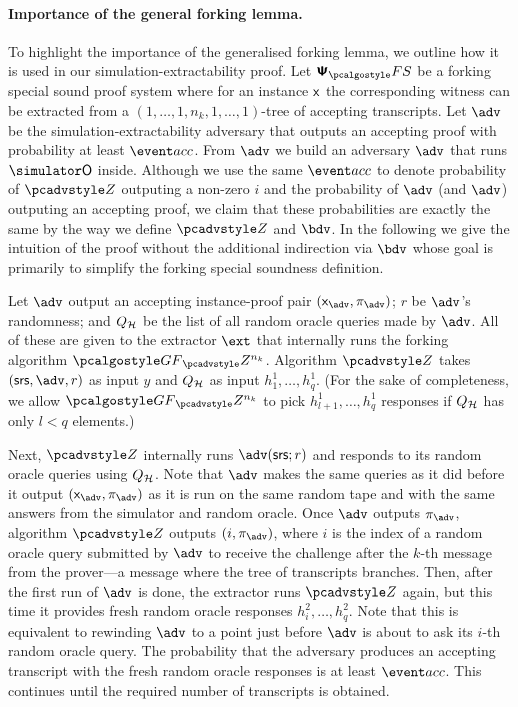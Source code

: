 \paragraph{Importance of the general forking lemma.}
To highlight the importance of the generalised forking lemma, we outline 
how it is used in our  simulation-extractability proof.  Let $\psfs$ be a
forking special sound proof system where for an instance $\mathsf{x}$ the
corresponding witness can be extracted from a
$(1, \ldots, 1, n_k, 1, \ldots, 1)$-tree of accepting transcripts.  Let $\advse$
be the simulation-extractability adversary that outputs an accepting proof with
probability at least $\accProb$. From $\adv$ we build an adversary $\adv$ that runs $\simO$ inside. Although we use the same $\accProb$ to denote
probability of $\zdv$ outputing a non-zero $i$ and the probability of $\advse$ (and $\adv$)
outputing an accepting proof, we claim that these probabilities are exactly the
same by the way we define $\zdv$ and $\bdv$. In the following we give the intuition of the proof without the additional indirection via $\bdv$ whose goal is primarily to simplify the forking special soundness definition.

Let $\adv$ output an accepting instance-proof pair
$(\inp_{\advse},\zkproof_{\advse})$; $r$ be $\adv$'s
randomness; %
and $Q_{\mathcal{H}}$ be the list of all random oracle
queries made by $\adv$.  All of these are given to the extractor $\ext$ that
internally runs the forking algorithm $\genforking_\zdv^{n_k}$.  Algorithm $\zdv$
takes $(\srs, \advse, \COMMENT{Q, }r)$ as input $y$ and $Q_{\mathcal{H}}$ as input $h_1^1, \ldots,
h_q^1$. 
(For the sake of completeness, we allow $\genforking_\zdv^{n_k}$ to
pick $h^1_{l + 1}, \ldots, h^1_q$ responses if $Q_{\mathcal{H}}$ has only $l < q$
elements.)  

Next, $\zdv$ internally runs $\adv(\srs; r)$ %
and responds to its random
oracle queries using $Q_{\mathcal{H}}$. Note that $\adv$ makes
the same queries as it did before it output $(\inp_{\advse}, \zkproof_{\advse})$
as it is run on the same random tape and with the same answers from the
simulator and random oracle. Once $\adv$ outputs
$\zkproof_{\advse}$, algorithm $\zdv$ outputs $(i, \zkproof_{\advse})$, where
$i$ is the index of a random oracle query submitted by $\advse$ to receive the challenge after the
$k$-th message from the prover---a message where the tree of transcripts
branches.
Then, after the first run of $\advse$ is done, the extractor runs $\zdv$ again,
but this time it provides fresh random oracle responses $h^2_i, \ldots,
h^2_q$. Note that this is equivalent to rewinding $\advse$ to a point just
before $\advse$ is about to ask its $i$-th random oracle
query. The probability that the adversary produces an accepting transcript with the
fresh random oracle responses is at least $\accProb$. This continues until the
required number of transcripts is obtained. 

